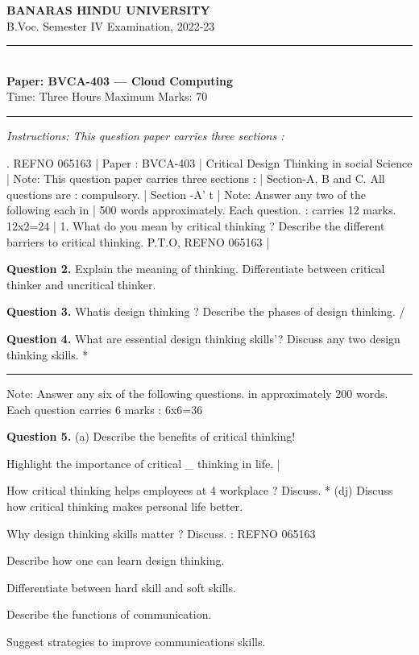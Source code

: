 \documentclass[11pt,a4paper]{article}
\begin{document}
\begin{center}
  {\large\bfseries BANARAS HINDU UNIVERSITY}\\[2pt]
  {\normalsize B.Voc. Semester IV Examination, 2022-23}\\[6pt]
  \rule{0.8\linewidth}{0.5pt}\\[6pt]
  {\large\bfseries Paper: BVCA-403 --- Cloud Computing}\\[4pt]
  {\normalsize Time: Three Hours \hfill Maximum Marks: 70}
\end{center}

\rule{\linewidth}{0.4pt}

\smallskip
\noindent\textit{Instructions: This question paper carries three sections :}

\bigskip

. REFNO 065163
| Paper : BVCA-403
| Critical Design Thinking in social Science
| Note: This question paper carries three sections :
| Section-A, B and C. All questions are
: compulsory.
| Section -A’
t
| Note: Answer any two of the following each in
| 500 words approximately. Each question.
: carries 12 marks. 12x2=24
| 1. What do you mean by critical thinking ?
Describe the different barriers to critical
thinking.
P.T.O,
REFNO 065163 |

\medskip\noindent\textbf{Question 2.} Explain the meaning of thinking. Differentiate
between critical thinker and uncritical
thinker.

\medskip\noindent\textbf{Question 3.} Whatis design thinking ? Describe the phases
of design thinking. /

\medskip\noindent\textbf{Question 4.} What are essential design thinking skills'?
Discuss any two design thinking skills. *

\bigskip{}
\rule{\linewidth}{0.4pt}\smallskip

Note: Answer any six of the following questions.
in approximately 200 words. Each question
carries 6 marks : 6x6=36

\medskip\noindent\textbf{Question 5.} (a) Describe the benefits of critical thinking!
\begin{parts}
  \item Highlight the importance of critical \_
  thinking in life. |
  \item How critical thinking helps employees at
  4 workplace ? Discuss.
  * (dj) Discuss how critical thinking makes
  personal life better.
  \item Why design thinking skills matter ?
  Discuss.
  : REFNO 065163
  \item Describe how one can learn design
  thinking.
  \item Differentiate between hard skill and soft
skills.
  \item Describe the functions of communication.
  \item Suggest strategies to improve
  communications skills.
\end{parts}
\end{document}
